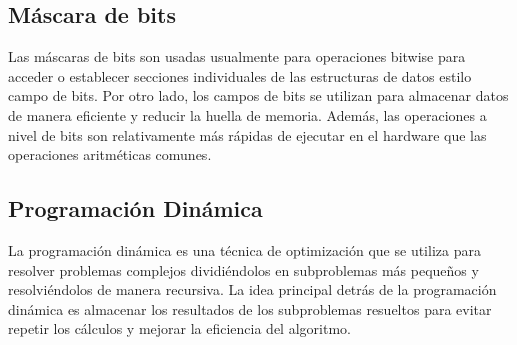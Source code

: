 \subsection{Máscara de bits}
Las máscaras de bits son usadas usualmente para operaciones bitwise para acceder o establecer secciones individuales de las estructuras de datos estilo campo de bits. Por otro lado, los campos de bits se utilizan para almacenar datos de manera eficiente y reducir la huella de memoria. Además, las operaciones a nivel de bits son relativamente más rápidas de ejecutar en el hardware que las operaciones aritméticas comunes. 

\subsection{Programación Dinámica}
La programación dinámica es una técnica de optimización que se utiliza para resolver problemas complejos dividiéndolos en subproblemas más pequeños y resolviéndolos de manera recursiva. La idea principal detrás de la programación dinámica es almacenar los resultados de los subproblemas resueltos para evitar repetir los cálculos y mejorar la eficiencia del algoritmo.